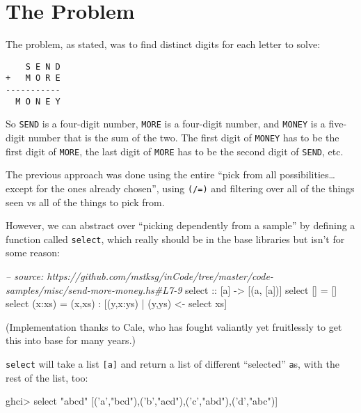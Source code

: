 \documentclass[]{article}
\newenvironment{Shaded}{}{}
\newcommand{\CharTok}[1]{\textcolor[rgb]{0.25,0.44,0.63}{{#1}}}
\newcommand{\StringTok}[1]{\textcolor[rgb]{0.25,0.44,0.63}{{#1}}}
\newcommand{\CommentTok}[1]{\textcolor[rgb]{0.38,0.63,0.69}{\textit{{#1}}}}
\newcommand{\OtherTok}[1]{\textcolor[rgb]{0.00,0.44,0.13}{{#1}}}
\newcommand{\FunctionTok}[1]{\textcolor[rgb]{0.02,0.16,0.49}{{#1}}}
\newcommand{\NormalTok}[1]{{#1}}
\begin{document}
\section{The Problem}\label{the-problem}

The problem, as stated, was to find distinct digits for each letter to
solve:

\begin{verbatim}
    S E N D
+   M O R E
-----------
  M O N E Y
\end{verbatim}

So \texttt{SEND} is a four-digit number, \texttt{MORE} is a four-digit
number, and \texttt{MONEY} is a five-digit number that is the sum of the
two. The first digit of \texttt{MONEY} has to be the first digit of
\texttt{MORE}, the last digit of \texttt{MORE} has to be the second
digit of \texttt{SEND}, etc.

The previous approach was done using the entire ``pick from all
possibilities\ldots{}except for the ones already chosen'', using
\texttt{(/=)} and filtering over all of the things seen vs all of the
things to pick from.

However, we can abstract over ``picking dependently from a sample'' by
defining a function called \texttt{select}, which really should be in
the base libraries but isn't for some reason:

\begin{Shaded}
\begin{Highlighting}[]
\CommentTok{-- source: https://github.com/mstksg/inCode/tree/master/code-samples/misc/send-more-money.hs#L7-9}
\OtherTok{select ::} \NormalTok{[a] }\OtherTok{->} \NormalTok{[(a, [a])]}
\NormalTok{select []     }\FunctionTok{=} \NormalTok{[]}
\NormalTok{select (x}\FunctionTok{:}\NormalTok{xs) }\FunctionTok{=} \NormalTok{(x,xs) }\FunctionTok{:} \NormalTok{[(y,x}\FunctionTok{:}\NormalTok{ys) }\FunctionTok{|} \NormalTok{(y,ys) }\OtherTok{<-} \NormalTok{select xs]}
\end{Highlighting}
\end{Shaded}

(Implementation thanks to Cale, who has fought valiantly yet fruitlessly
to get this into base for many years.)

\texttt{select} will take a list \texttt{{[}a{]}} and return a list of
different ``selected'' \texttt{a}s, with the rest of the list, too:

\begin{Shaded}
\begin{Highlighting}[]
\NormalTok{ghci}\FunctionTok{>} \NormalTok{select }\StringTok{"abcd"}
\NormalTok{[(}\CharTok{'a'}\NormalTok{,}\StringTok{"bcd"}\NormalTok{),(}\CharTok{'b'}\NormalTok{,}\StringTok{"acd"}\NormalTok{),(}\CharTok{'c'}\NormalTok{,}\StringTok{"abd"}\NormalTok{),(}\CharTok{'d'}\NormalTok{,}\StringTok{"abc"}\NormalTok{)]}
\end{Highlighting}
\end{Shaded}
\end{document}
